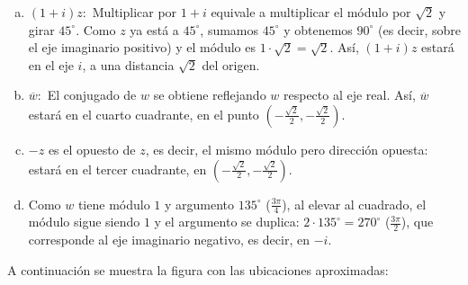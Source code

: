 \begin{prob}
\begin{myproof}
\begin{enumerate}[a)]
\item $(1+i)z:$ Multiplicar por $1+i$ equivale a multiplicar el módulo por $\sqrt{2}$ y girar $45^\circ$. Como $z$ ya está a $45^\circ$, sumamos $45^\circ$ y obtenemos $90^\circ$ (es decir, sobre el eje imaginario positivo) y el módulo es $1 \cdot \sqrt{2} = \sqrt{2}$. Así, $(1+i)z$ estará en el eje $i$, a una distancia $\sqrt{2}$ del origen.

\item $\overline{w}:$ El conjugado de $w$ se obtiene reflejando $w$ respecto al eje real. Así, $\overline{w}$ estará en el cuarto cuadrante, en el punto $(-\frac{\sqrt{2}}{2}, -\frac{\sqrt{2}}{2})$.

\item $-z$ es el opuesto de $z$, es decir, el mismo módulo pero dirección opuesta: estará en el tercer cuadrante, en $(-\frac{\sqrt{2}}{2}, -\frac{\sqrt{2}}{2})$.

\item Como $w$ tiene módulo $1$ y argumento $135^\circ$ ($\frac{3\pi}{4}$), al elevar al cuadrado, el módulo sigue siendo $1$ y el argumento se duplica: $2 \cdot 135^\circ = 270^\circ$ ($\frac{3\pi}{2}$), que corresponde al eje imaginario negativo, es decir, en $-i$.
\end{enumerate}

A continuación se muestra la figura con las ubicaciones aproximadas:

\begin{figure}[H]
\centering
{}
\end{figure}
\end{myproof}
\end{prob}

